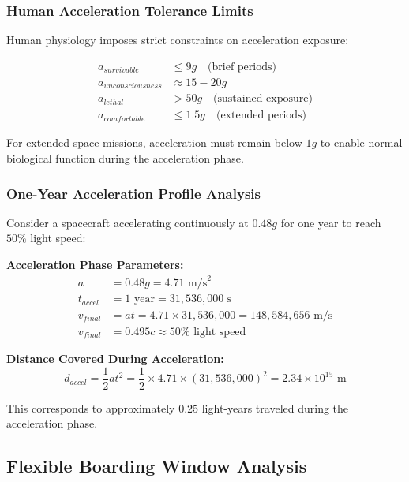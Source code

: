 \documentclass[11pt,a4paper]{article}
\theoremstyle{remark}
\begin{document}
\subsubsection{Human Acceleration Tolerance Limits}

Human physiology imposes strict constraints on acceleration exposure:

\begin{align}
a_{survivable} &\leq 9g \quad \text{(brief periods)} \\
a_{unconsciousness} &\approx 15-20g \\
a_{lethal} &> 50g \quad \text{(sustained exposure)} \\
a_{comfortable} &\leq 1.5g \quad \text{(extended periods)}
\end{align}

For extended space missions, acceleration must remain below $1g$ to enable normal biological function during the acceleration phase.

\subsubsection{One-Year Acceleration Profile Analysis}

Consider a spacecraft accelerating continuously at $0.48g$ for one year to reach $50\%$ light speed:

\textbf{Acceleration Phase Parameters:}
\begin{align}
a &= 0.48g = 4.71 \text{ m/s}^2 \\
t_{accel} &= 1 \text{ year} = 31,536,000 \text{ s} \\
v_{final} &= at = 4.71 \times 31,536,000 = 148,584,656 \text{ m/s} \\
v_{final} &= 0.495c \approx 50\% \text{ light speed}
\end{align}

\textbf{Distance Covered During Acceleration:}
\begin{equation}
d_{accel} = \frac{1}{2}at^2 = \frac{1}{2} \times 4.71 \times (31,536,000)^2 = 2.34 \times 10^{15} \text{ m}
\end{equation}

This corresponds to approximately $0.25$ light-years traveled during the acceleration phase.

\subsection{Flexible Boarding Window Analysis}
\end{document}

